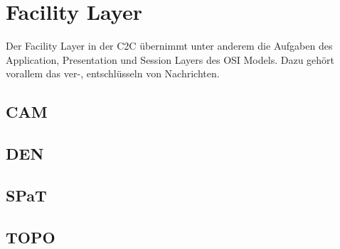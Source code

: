 
\chapter{Facility Layer\label{chap:facilitylayer}}
Der Facility Layer in der \acl{C2C} übernimmt unter anderem die Aufgaben des Application, Presentation und Session Layers des OSI Models. Dazu gehört vorallem das ver-, entschlüsseln von Nachrichten. 


\section{CAM\label{sec:cam}}

\section{DEN\label{sec:den}}


\section{SPaT\label{sec:spat}}

\section{TOPO\label{sec:topo}}
